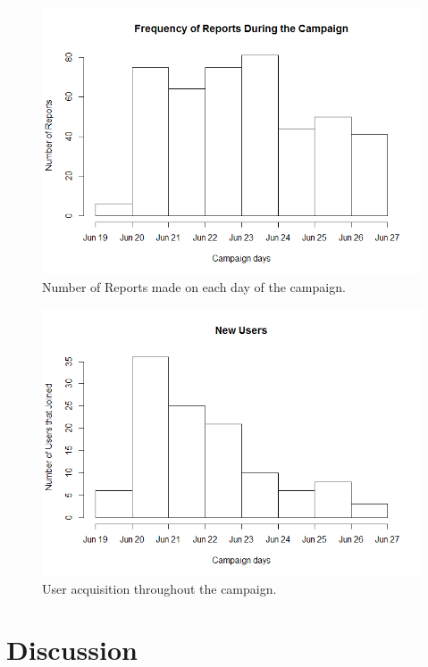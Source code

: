 \documentclass[letterpaper]{article}
\begin{document}
\begin{figure}[htb]
	\begin{center}
		\includegraphics[width=1\linewidth]{images/RPerDay}
		\caption{Number of Reports made on each day of the campaign.\label{fig:freqreportsperday1}}
	\end{center}
\end{figure}

\begin{figure}[htb]
	\begin{center}
		\includegraphics[width=1\linewidth]{images/NewUsers}
		\caption{User acquisition throughout the campaign.\label{fig:newusers1}}
	\end{center}
\end{figure}

\section{Discussion}
\end{document}
